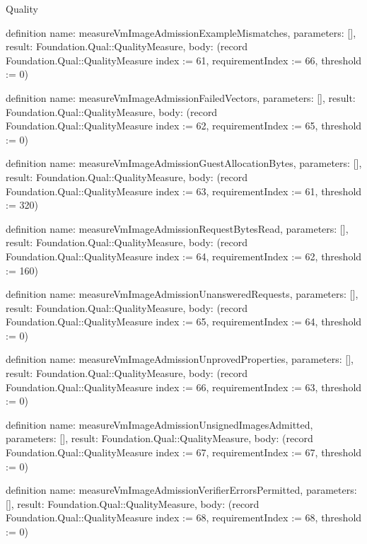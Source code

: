 \begin{lexlean}{Quality}
\begin{semanticmodule}
definition{
  name: measureVmImageAdmissionExampleMismatches,
  parameters: [],
  result: Foundation.Qual::QualityMeasure,
  body: (record Foundation.Qual::QualityMeasure {index := 61, requirementIndex := 66, threshold := 0})
}

definition{
  name: measureVmImageAdmissionFailedVectors,
  parameters: [],
  result: Foundation.Qual::QualityMeasure,
  body: (record Foundation.Qual::QualityMeasure {index := 62, requirementIndex := 65, threshold := 0})
}

definition{
  name: measureVmImageAdmissionGuestAllocationBytes,
  parameters: [],
  result: Foundation.Qual::QualityMeasure,
  body: (record Foundation.Qual::QualityMeasure {index := 63, requirementIndex := 61, threshold := 320})
}

definition{
  name: measureVmImageAdmissionRequestBytesRead,
  parameters: [],
  result: Foundation.Qual::QualityMeasure,
  body: (record Foundation.Qual::QualityMeasure {index := 64, requirementIndex := 62, threshold := 160})
}

definition{
  name: measureVmImageAdmissionUnansweredRequests,
  parameters: [],
  result: Foundation.Qual::QualityMeasure,
  body: (record Foundation.Qual::QualityMeasure {index := 65, requirementIndex := 64, threshold := 0})
}

definition{
  name: measureVmImageAdmissionUnprovedProperties,
  parameters: [],
  result: Foundation.Qual::QualityMeasure,
  body: (record Foundation.Qual::QualityMeasure {index := 66, requirementIndex := 63, threshold := 0})
}

definition{
  name: measureVmImageAdmissionUnsignedImagesAdmitted,
  parameters: [],
  result: Foundation.Qual::QualityMeasure,
  body: (record Foundation.Qual::QualityMeasure {index := 67, requirementIndex := 67, threshold := 0})
}

definition{
  name: measureVmImageAdmissionVerifierErrorsPermitted,
  parameters: [],
  result: Foundation.Qual::QualityMeasure,
  body: (record Foundation.Qual::QualityMeasure {index := 68, requirementIndex := 68, threshold := 0})
}


\end{semanticmodule}
\end{lexlean}
